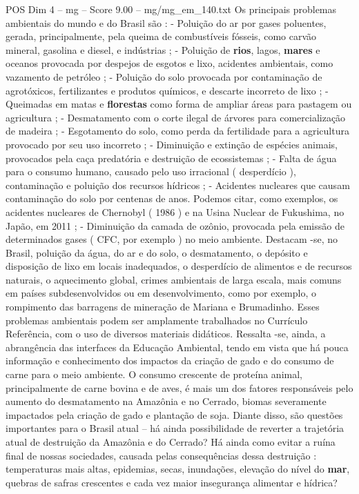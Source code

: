 \begin{textsample}{POS Dim 4 – mg – Score 9.00 – mg/mg\_em\_140.txt}
Os principais problemas ambientais do mundo e do Brasil são : - Poluição do ar por gases poluentes, gerada, principalmente, pela queima de combustíveis fósseis, como carvão mineral, gasolina e diesel, e indústrias ; - Poluição de \textbf{rios}, lagos, \textbf{mares} e oceanos provocada por despejos de esgotos e lixo, acidentes ambientais, como vazamento de petróleo ; - Poluição do solo provocada por contaminação de agrotóxicos, fertilizantes e produtos químicos, e descarte incorreto de lixo ; - Queimadas em matas e \textbf{florestas} como forma de ampliar áreas para pastagem ou agricultura ; - Desmatamento com o corte ilegal de árvores para comercialização de madeira ; - Esgotamento do solo, como perda da fertilidade para a agricultura provocado por seu uso incorreto ; - Diminuição e extinção de espécies animais, provocados pela caça predatória e destruição de ecossistemas ; - Falta de água para o consumo humano, causado pelo uso irracional ( desperdício ), contaminação e poluição dos recursos hídricos ; - Acidentes nucleares que causam contaminação do solo por centenas de anos.
Podemos citar, como exemplos, os acidentes nucleares de Chernobyl ( 1986 ) e na Usina Nuclear de Fukushima, no Japão, em 2011 ; - Diminuição da camada de ozônio, provocada pela emissão de determinados gases ( CFC, por exemplo ) no meio ambiente.
Destacam -se, no Brasil, poluição da água, do ar e do solo, o desmatamento, o depósito e disposição de lixo em locais inadequados, o desperdício de alimentos e de recursos naturais, o aquecimento global, crimes ambientais de larga escala, mais comuns em países subdesenvolvidos ou em desenvolvimento, como por exemplo, o rompimento das barragens de mineração de Mariana e Brumadinho.
Esses problemas ambientais podem ser amplamente trabalhados no Currículo Referência, com o uso de diversos materiais didáticos.
Ressalta -se, ainda, a abrangência das interfaces da Educação Ambiental, tendo em vista que há pouca informação e conhecimento dos impactos da criação de gado e do consumo de carne para o meio ambiente.
O consumo crescente de proteína animal, principalmente de carne bovina e de aves, é mais um dos fatores responsáveis pelo aumento do desmatamento na Amazônia e no Cerrado, biomas severamente impactados pela criação de gado e plantação de soja.
Diante disso, são questões importantes para o Brasil atual – há ainda possibilidade de reverter a trajetória atual de destruição da Amazônia e do Cerrado?
Há ainda como evitar a ruína final de nossas sociedades, causada pelas consequências dessa destruição : temperaturas mais altas, epidemias, secas, inundações, elevação do nível do \textbf{mar}, quebras de safras crescentes e cada vez maior insegurança alimentar e hídrica?

\end{textsample}
